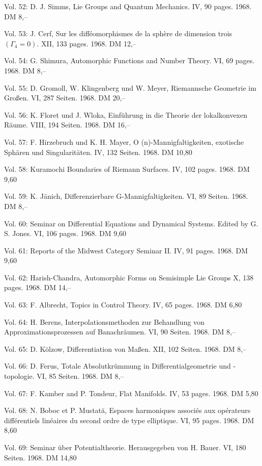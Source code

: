 Vol. 52: D. J. Simms, Lie Groups and Quantum Mechanics. IV, 90 pages. 1968. DM 8,--

Vol. 53: J. Cerf, Sur les difféomorphismes de la sphère de dimension trois \((\Gamma_4=0)\). XII, 133 pages. 1968. DM 12,--

Vol. 54: G. Shimura, Automorphic Functions and Number Theory. VI, 69 pages. 1968. DM 8,--

Vol. 55: D. Gromoll, W. Klingenberg und W. Meyer, Riemannsche Geometrie im Großen. VI, 287 Seiten. 1968. DM 20,--

Vol. 56: K. Floret und J. Wloka, Einführung in die Theorie der lokalkonvexen Räume. VIII, 194 Seiten. 1968. DM 16,--

Vol. 57: F. Hirzebruch und K. H. Mayer, O (n)-Mannigfaltigkeiten, exotische Sphären und Singularitäten. IV, 132 Seiten. 1968. DM 10,80

Vol. 58: Kuramochi Boundaries of Riemann Surfaces. IV, 102 pages. 1968. DM 9,60

Vol. 59: K. Jänich, Differenzierbare G-Mannigfaltigkeiten. VI, 89 Seiten. 1968. DM 8,--

Vol. 60: Seminar on Differential Equations and Dynamical Systems. Edited by G. S. Jones. VI, 106 pages. 1968. DM 9,60

Vol. 61: Reports of the Midwest Category Seminar II. IV, 91 pages. 1968. DM 9,60

Vol. 62: Harish-Chandra, Automorphic Forms on Semisimple Lie Groups X, 138 pages. 1968. DM 14,--

Vol. 63: F. Albrecht, Topics in Control Theory. IV, 65 pages. 1968. DM 6,80

Vol. 64: H. Berens, Interpolationsmethoden zur Behandlung von Approximationsprozessen auf Banachräumen. VI, 90 Seiten. 1968. DM 8,--

Vol. 65: D. Kölzow, Differentiation von Maßen. XII, 102 Seiten. 1968. DM 8,--

Vol. 66: D. Ferus, Totale Absolutkrümmung in Differentialgeometrie und -topologie. VI, 85 Seiten. 1968. DM 8,--

Vol. 67: F. Kamber and P. Tondeur, Flat Manifolds. IV, 53 pages. 1968. DM 5,80

Vol. 68: N. Boboc et P. Mustată, Espaces harmoniques associés aux opérateurs différentiels linéaires du second ordre de type elliptique. VI, 95 pages. 1968. DM 8,60

Vol. 69: Seminar über Potentialtheorie. Herausgegeben von H. Bauer. VI, 180 Seiten. 1968. DM 14,80

